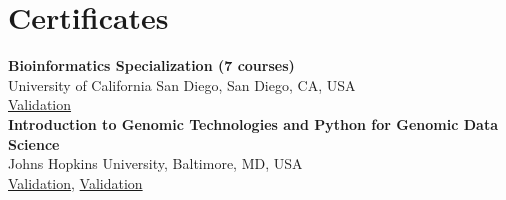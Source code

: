 \documentclass[a4paper,9pt]{extarticle}
\begin{document}

\section*{Certificates}

\noindent
\newline
\textbf{Bioinformatics Specialization (7 courses)} \\
University of California San Diego, San Diego, CA, USA\\ \href{https://www.coursera.org/account/accomplishments/specialization/EV4TMKLBTG63}{Validation}\\

\noindent
\textbf{Introduction to Genomic Technologies and Python for Genomic Data Science} \\
Johns Hopkins University, Baltimore, MD, USA\\
\href{https://www.coursera.org/account/accomplishments/records/R52ZVQVWLBUG}{Validation}, \href{https://www.coursera.org/account/accomplishments/records/83F8LA8HLETP}{Validation}\\

\end{document}
